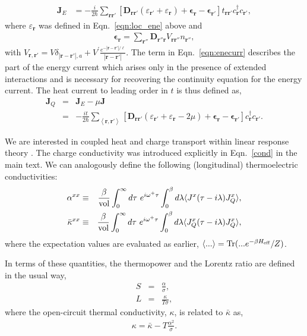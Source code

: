 \documentclass[aps,prx,onecolumn,amsmath,nofootinbib,amssymb,11pt]{revtex4-1}
\renewcommand{\vec}[1]{\boldsymbol{#1}}
\def \r {{\vec r}}
\def \beq {\begin{eqnarray}}
\def \eeq {\end{eqnarray}}
\def \tn {\textnormal}
\begin{document}
{\begin{appendix}
\beq
\bm{J}_{E} 
 &= -\frac{i}{2\hbar}\sum_{\r\r'}\left[\bm{D}_{\r\r'}\left(\varepsilon_{\r'}+\varepsilon_{\r}\right)+\bm{\epsilon}_{\r}-\bm{\epsilon}_{\r'}\right]t_{\r\r'}c_{\r}^{\dagger}c_{\r'},
\eeq
where $\varepsilon_{\r}$ was defined in Eqn.~\ref{eqn:loc_ene} above and 
\beq
\bm{\epsilon}_{\r}=\sum_{\r''}\bm{D}_{\r''\r}V_{\r\r''}n_{\r''},
\label{eqn:enecurr}
\eeq
with $V_{\r,\r'}=V\delta_{|\r-\r'|,a}+V^{\prime}\frac{e^{-\left|\r-\r'\right|/\ell}}{\left|\r-\r'\right|}$. The term in Eqn.~\ref{eqn:enecurr} describes the part of the energy current which arises only in the presence of extended interactions and is necessary for recovering the continuity equation for the energy current.  
The heat current to leading order in $t$ is thus defined as, 
\beq
\bm{J}_{Q} &=& \bm{J}_{E}-\mu\bm{J}\\
 &=& -\frac{it}{2\hbar}\sum_{\left\langle \r,\r'\right\rangle }\left[\bm{D}_{\r\r'}\left(\varepsilon_{\r'}+\varepsilon_{\r}-2\mu\right)+\bm{\epsilon}_{\r}-\bm{\epsilon}_{\r'}\right]c_{\r}^{\dagger}c_{\r'}.
\eeq

We are interested in coupled heat and charge transport within linear response theory \cite{ziman}. The charge conductivity was introduced explicitly in Eqn.~\ref{cond} in the main text. We can analogously define the following (longitudinal) thermoelectric conductivities:
\beq
\alpha^{xx} &\equiv& \frac{\beta}{\tn{vol}} \int_0^\infty d\tau~e^{i\omega^+\tau} \int_0^\beta d\lambda \langle J^x(\tau-i\lambda) J_Q^x\rangle,\\
\bar{\kappa}^{xx} &\equiv& \frac{\beta}{\tn{vol}} \int_0^\infty d\tau~e^{i\omega^+\tau} \int_0^\beta d\lambda \langle J_Q^x(\tau-i\lambda) J_Q^x\rangle,
\label{thermoel}
\eeq
where the expectation values are evaluated as earlier, $\langle...\rangle = \tn{Tr}(...e^{-\beta H_{\tn{eff}}}/Z)$.


In terms of these quantities, the thermopower and the Lorentz ratio are defined in the usual way,
\beq
S &=& \frac{\alpha}{\sigma},\\
L &=& \frac{\kappa}{T\sigma},
\eeq
where the open-circuit thermal conductivity, $\kappa$, is related to $\bar{\kappa}$ as,
\beq
\kappa=\bar{\kappa}-T\frac{\alpha^{2}}{\sigma}.
\eeq


\end{appendix}}
\end{document}
